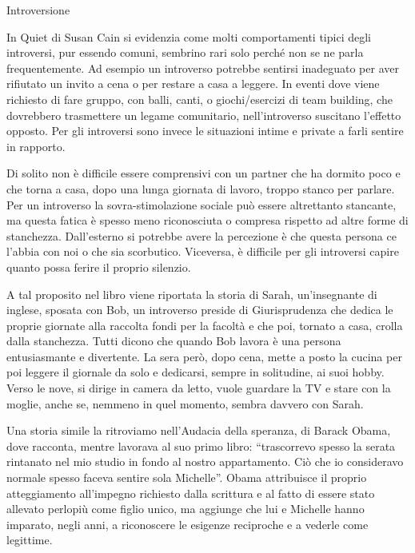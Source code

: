 \documentclass[12pt]{book} %
\begin{document}
\begin{mdframed}[linewidth=1pt]
Introversione

In Quiet di Susan Cain si evidenzia come molti comportamenti tipici degli introversi, pur essendo comuni, sembrino rari solo perché non se ne parla frequentemente. Ad esempio un introverso potrebbe sentirsi inadeguato per aver rifiutato un invito a cena o per restare a casa a leggere. In eventi dove
viene richiesto di fare gruppo, con balli, canti, o giochi/esercizi di team building, che dovrebbero trasmettere un
legame comunitario, nell'introverso suscitano l'effetto opposto. Per gli
introversi sono invece le situazioni intime e private a farli sentire in rapporto.

Di solito non è difficile essere comprensivi con un partner che ha dormito poco e che torna a casa, dopo una lunga
giornata di lavoro, troppo stanco per parlare. Per un introverso la sovra-stimolazione sociale può essere altrettanto
stancante, ma questa fatica è spesso meno riconosciuta o compresa rispetto ad altre forme di stanchezza. Dall'esterno si potrebbe avere la percezione è che questa persona ce l'abbia con noi o che sia scorbutico. Viceversa, è difficile per gli introversi capire quanto possa ferire il proprio silenzio. 

A tal proposito nel libro viene riportata la storia di Sarah, un'insegnante di inglese, sposata con Bob, un introverso
preside di Giurisprudenza che dedica le proprie giornate alla raccolta fondi per la facoltà e che poi, tornato a casa,
crolla dalla stanchezza. Tutti dicono che quando Bob lavora è una
persona entusiasmante e divertente. La sera però, dopo cena, mette a posto la cucina per poi leggere il giornale da solo e
dedicarsi, sempre in solitudine, ai suoi hobby. Verso le nove, si dirige in camera da letto, vuole
guardare la TV e stare con la moglie, anche se, nemmeno in quel momento, sembra davvero con Sarah.

Una storia simile la ritroviamo nell'Audacia della speranza, di Barack Obama, dove racconta, mentre lavorava al suo primo libro: 
“trascorrevo spesso la serata rintanato nel mio studio in fondo al nostro
appartamento. Ciò che io consideravo normale spesso faceva sentire sola Michelle”. Obama attribuisce il proprio
atteggiamento all'impegno richiesto dalla scrittura e al fatto di essere stato allevato perlopiù come figlio unico, ma
aggiunge che lui e Michelle hanno imparato, negli anni, a riconoscere le esigenze reciproche e a vederle come legittime. 


\end{mdframed}
\end{document}
